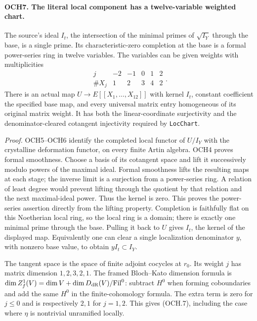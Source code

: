 \paragraph{OCH7. The literal local component has a twelve-variable weighted chart.}
\label{claim:OCH7}
The source's ideal \(I_t\), the intersection of the minimal primes
of \(\sqrt{I_Y}\) through the base, is a single prime.  Its
characteristic-zero completion at the base is a formal power-series
ring in twelve variables.  The variables can be given weights with
multiplicities
\[
 \begin{array}{c|rrrrr}j&-2&-1&0&1&2\\\hline
                   \#X_j&1&2&3&4&2\end{array}.
 \tag{OCH.7}
\]
There is an actual map
\(U\to E[[X_1,\ldots,X_{12}]]\) with kernel \(I_t\),
constant coefficient the specified base map, and every universal
matrix entry homogeneous of its original matrix weight.  It has
both the linear-coordinate surjectivity and the denominator-cleared
cotangent injectivity required by \texttt{LocChart}.

\emph{Proof.}
OCH5--OCH6 identify the completed local functor of \(U/I_Y\)
with the crystalline deformation functor, on every finite Artin
algebra.  OCH4 proves formal smoothness.  Choose a basis of its
cotangent space and lift it successively modulo powers of the maximal
ideal.  Formal smoothness lifts the resulting maps at each stage;
the inverse limit is a surjection from a power-series ring.  A
relation of least degree would prevent lifting through the quotient
by that relation and the next maximal-ideal power.  Thus the kernel
is zero.  This proves the power-series assertion directly from the
lifting property.  Completion is faithfully flat on this Noetherian
local ring, so the local ring is a domain; there is exactly one
minimal prime through the base.  Pulling it back to \(U\) gives
\(I_t\), the kernel of the displayed map.  Equivalently one can
clear a single localization denominator \(y\), with nonzero base
value, to obtain \(yI_t\subset I_Y\).

The tangent space is the space of finite adjoint cocycles at \(r_0\).
Its weight \(j\) has matrix dimension \(1,2,3,2,1\).
The framed Bloch--Kato dimension formula is
\(\dim Z^1_f(V)=\dim V+\dim D_{\rm dR}(V)/\mathrm{Fil}^0\):
subtract \(H^0\) when forming coboundaries and add the same
\(H^0\) in the finite-cohomology formula.  The extra term is
zero for \(j\le0\) and is respectively \(2,1\) for
\(j=1,2\).  This gives (OCH.7), including the case where
\(\eta\) is nontrivial unramified locally.

